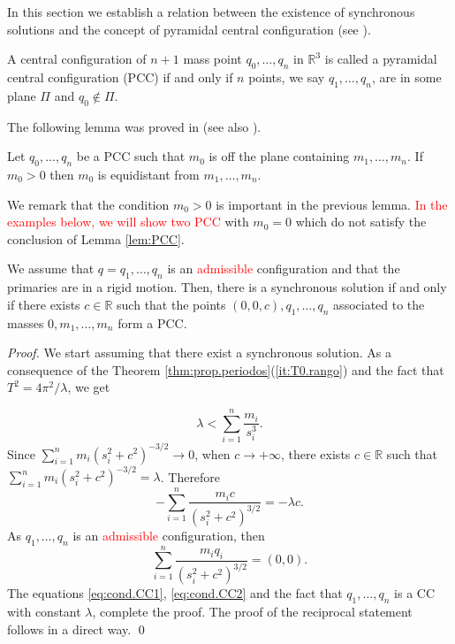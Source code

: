 \documentclass[smallcondensed]{svjour3}
\newcommand{\rr}{\mathbb{R}}
\begin{document}
In this section we establish a relation between the existence of synchronous solutions and the concept of pyramidal central configuration (see \cite{fayccal1996classification,faycaltesis,ouyang2004pyramidal}).

\begin{definition}
A central configuration of $n+1$ mass point $q_0,\ldots,q_{n}$ in $\rr^{3}$  is called a pyramidal central configuration (PCC) if and only if $n$ points, we say $q_1,\ldots,q_n$, are in some plane $\Pi$ and $q_{0}\notin \Pi$.
\end{definition}

The following lemma was proved in \cite{ouyang2004pyramidal} (see also \cite{faycaltesis}).
\begin{lemma}\label{lem:PCC}
 Let $q_0,\ldots,q_{n}$ be a PCC such that $m_{0}$ is off the plane containing $m_1,\ldots,m_n$. If $m_{0}>0$ then $m_{0}$ is equidistant from $m_1,\ldots,m_n$.
\end{lemma}

We remark that the condition $m_{0}>0$ is important in the previous lemma. \textcolor{red}{In the examples below, we will show  two PCC} with $m_{0}=0$ which do not satisfy the conclusion of  Lemma \ref{lem:PCC}.



\begin{proposition}\label{cor:sol.sincronica}
We assume that $q=q_1,\ldots,q_n$ is an \textcolor{red}{admissible}   configuration and that the primaries are in a rigid motion. Then, there is a synchronous solution if and only if there exists $c\in \rr$ such that the points $(0,0,c),q_1,\ldots,q_{n}$ associated to the masses $0,m_1,\ldots,m_{n}$ form a PCC.
\end{proposition}

\begin{proof}
We start assuming that there exist a synchronous solution. As a consequence of the Theorem \ref{thm:prop.periodos}(\ref{it:T0.rango}) and the fact that $T^2=4\pi^2/\lambda$, we get

 \begin{equation}\label{eq:lamdbda<suma.si3}
\lambda<\sum_{i=1}^n\frac{m_i}{s_i^3}.
 \end{equation}
 Since $\sum_{i=1}^{n}m_i\left(s_i^2+c^2\right)^{-3/2}\to 0$, when $c\to +\infty$, there exists $c\in \rr$ such that
 $ \sum_{i=1}^{n}m_i\left(s_i^2+c^2\right)^{-3/2}=\lambda$. Therefore
 \begin{equation}\label{eq:cond.CC1}
  -\sum_{i=1}^{n}\frac{m_i c}{\left(s_i^2+c^2\right)^{3/2}}=-\lambda c.
 \end{equation}
As $q_1,\ldots,q_n$ is an \textcolor{red}{admissible} configuration, then
\begin{equation}\label{eq:cond.CC2}
   \sum_{i=1}^{n}\frac{m_i q_i}{\left(s_i^2+c^2\right)^{3/2}}= (0,0).
\end{equation}
The equations \eqref{eq:cond.CC1}, \eqref{eq:cond.CC2}  and the fact that $q_1,\ldots,q_n$ is a CC with constant $\lambda$, complete the proof.
The proof of the reciprocal statement follows in a direct way.
\qed\end{proof}
\end{document}
